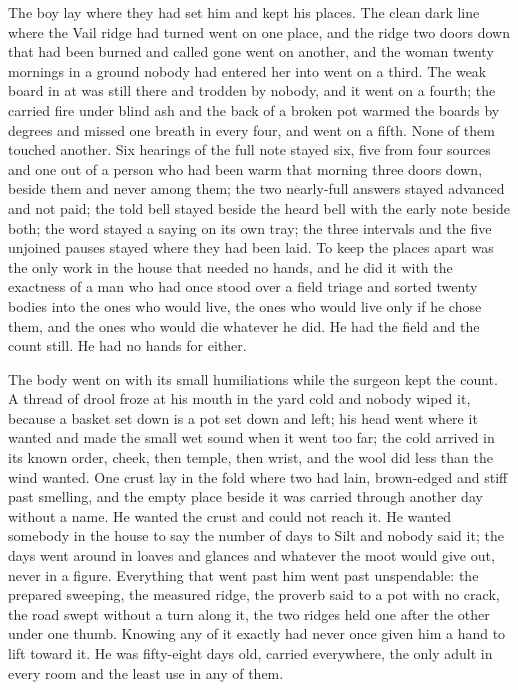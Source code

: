 The boy lay where they had set him and kept his places. The clean dark line where the Vail ridge had turned went on one place, and the ridge two doors down that had been burned and called gone went on another, and the woman twenty mornings in a ground nobody had entered her into went on a third. The weak board in  at  was still there and trodden by nobody, and it went on a fourth; the carried fire under blind ash and the back of a broken pot warmed the boards by degrees and missed one breath in every four, and  went on a fifth. None of them touched another. Six hearings of the full note stayed six, five from four sources and one out of a person who had been warm that morning three doors down, beside them and never among them; the two nearly-full answers stayed advanced and not paid; the told bell stayed beside the heard bell with the early note beside both; the word stayed a saying on its own tray; the three intervals and the five unjoined pauses stayed where they had been laid. To keep the places apart was the only work in the house that needed no hands, and he did it with the exactness of a man who had once stood over a field triage and sorted twenty bodies into the ones who would live, the ones who would live only if he chose them, and the ones who would die whatever he did. He had the field and the count still. He had no hands for either.

The body went on with its small humiliations while the surgeon kept the count. A thread of drool froze at his mouth in the yard cold and nobody wiped it, because a basket set down is a pot set down and left; his head went where it wanted and made the small wet sound when it went too far; the cold arrived in its known order, cheek, then temple, then wrist, and the wool did less than the wind wanted. One crust lay in the fold where two had lain, brown-edged and stiff past smelling, and the empty place beside it was carried through another day without a name. He wanted the crust and could not reach it. He wanted somebody in the house to say the number of days to Silt and nobody said it; the days went around in loaves and glances and whatever the moot would give out, never in a figure. Everything that went past him went past unspendable: the prepared sweeping, the measured ridge, the proverb said to a pot with no crack, the road swept without a turn along it, the two ridges held one after the other under one thumb. Knowing any of it exactly had never once given him a hand to lift toward it. He was fifty-eight days old, carried everywhere, the only adult in every room and the least use in any of them.

